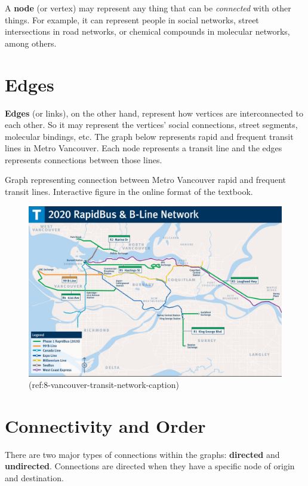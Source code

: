 \documentclass[
]{book}
\begin{document}
A \textbf{node} (or vertex) may represent any thing that can be \emph{connected} with other things. For example, it can represent people in social networks, street intersections in road networks, or chemical compounds in molecular networks, among others.

\section{Edges}\label{edges}

\textbf{Edges} (or links), on the other hand, represent how vertices are interconnected to each other. So it may represent the vertices' social connections, street segments, molecular bindings, etc. The graph below represents rapid and frequent transit lines in Metro Vancouver. Each node represents a transit line and the edges represents connections between those lines.

\label{fig:8-vancouver-transit-graph}Graph representing connection between Metro Vancouver rapid and frequent transit lines. Interactive figure in the online format of the textbook.

\begin{figure}
\includegraphics[width=0.75\linewidth]{images/08-metro_vancouver_transit_network} \caption{(ref:8-vancouver-transit-network-caption)}\label{fig:0-example}
\end{figure}

\section{Connectivity and Order}\label{connectivity-and-order}

There are two major types of connections within the graphs: \textbf{directed} and \textbf{undirected}. Connections are directed when they have a specific node of origin and destination.
\end{document}
